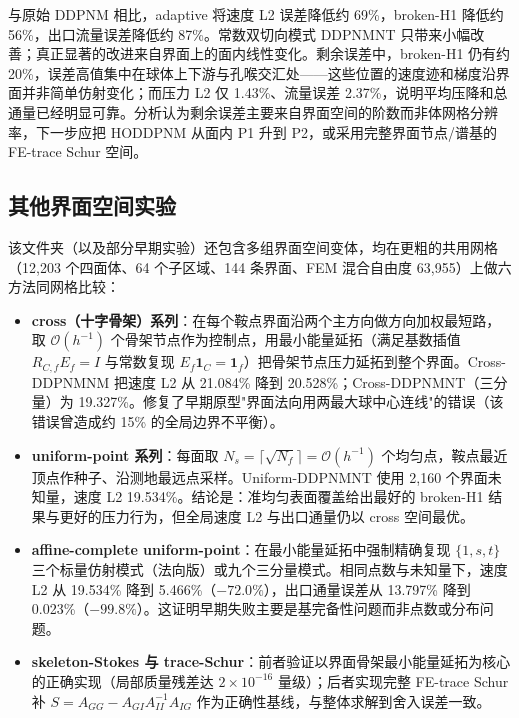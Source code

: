 \documentclass[11pt,a4paper]{ctexart}
\newcommand{\Dd}{DDPNM}
\begin{document}
与原始 \Dd{} 相比，adaptive 将速度 L2 误差降低约 69\%，broken-H1 降低约 56\%，出口流量误差降低约 87\%。常数双切向模式 \Dd{}NT 只带来小幅改善；真正显著的改进来自界面上的面内线性变化。剩余误差中，broken-H1 仍有约 20\%，误差高值集中在球体上下游与孔喉交汇处——这些位置的速度迹和梯度沿界面并非简单仿射变化；而压力 L2 仅 1.43\%、流量误差 2.37\%，说明平均压降和总通量已经明显可靠。分析认为剩余误差主要来自界面空间的阶数而非体网格分辨率，下一步应把 HODDPNM 从面内 P1 升到 P2，或采用完整界面节点/谱基的 FE-trace Schur 空间。

\subsection{其他界面空间实验}
\label{sec:3d-other}

该文件夹（以及部分早期实验）还包含多组界面空间变体，均在更粗的共用网格（12{,}203 个四面体、64 个子区域、144 条界面、FEM 混合自由度 63{,}955）上做六方法同网格比较：

\begin{itemize}[itemsep=2pt]
  \item \textbf{cross（十字骨架）系列}：在每个鞍点界面沿两个主方向做方向加权最短路，取 $\mathcal{O}(h^{-1})$ 个骨架节点作为控制点，用最小能量延拓（满足基数插值 $R_{C,f}E_f=I$ 与常数复现 $E_f\mathbf{1}_C=\mathbf{1}_f$）把骨架节点压力延拓到整个界面。Cross-\Dd{}NM 把速度 L2 从 21.084\% 降到 20.528\%；Cross-\Dd{}NT（三分量）为 19.327\%。修复了早期原型"界面法向用两最大球中心连线"的错误（该错误曾造成约 15\% 的全局边界不平衡）。
  \item \textbf{uniform-point 系列}：每面取 $N_s=\lceil\sqrt{N_f}\rceil=\mathcal{O}(h^{-1})$ 个均匀点，鞍点最近顶点作种子、沿测地最远点采样。Uniform-\Dd{}NT 使用 2{,}160 个界面未知量，速度 L2 19.534\%。结论是：准均匀表面覆盖给出最好的 broken-H1 结果与更好的压力行为，但全局速度 L2 与出口通量仍以 cross 空间最优。
  \item \textbf{affine-complete uniform-point}：在最小能量延拓中强制精确复现 $\{1,s,t\}$ 三个标量仿射模式（法向版）或九个三分量模式。相同点数与未知量下，速度 L2 从 19.534\% 降到 5.466\%（$-72.0\%$），出口通量误差从 13.797\% 降到 0.023\%（$-99.8\%$）。这证明早期失败主要是基完备性问题而非点数或分布问题。
  \item \textbf{skeleton-Stokes 与 trace-Schur}：前者验证以界面骨架最小能量延拓为核心的正确实现（局部质量残差达 $2\times10^{-16}$ 量级）；后者实现完整 FE-trace Schur 补 $S=A_{GG}-A_{GI}A_{II}^{-1}A_{IG}$ 作为正确性基线，与整体求解到舍入误差一致。
\end{itemize}
\end{document}
